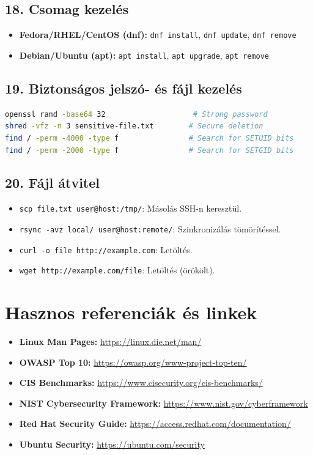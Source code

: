 \documentclass[12pt,a4paper]{article}
\begin{document}
\subsection{18. Csomag kezelés}

\begin{itemize}
  \item \textbf{Fedora/RHEL/CentOS (dnf):} \texttt{dnf install}, \texttt{dnf update}, \texttt{dnf remove}
  \item \textbf{Debian/Ubuntu (apt):} \texttt{apt install}, \texttt{apt upgrade}, \texttt{apt remove}
\end{itemize}

\subsection{19. Biztonságos jelszó- és fájl kezelés}

\begin{lstlisting}[language=bash,caption={Biztonságos műveletek}]
openssl rand -base64 32                    # Strong password
shred -vfz -n 3 sensitive-file.txt        # Secure deletion
find / -perm -4000 -type f                # Search for SETUID bits
find / -perm -2000 -type f                # Search for SETGID bits
\end{lstlisting}

\subsection{20. Fájl átvitel}

\begin{itemize}
  \item \texttt{scp file.txt user@host:/tmp/}: Másolás SSH-n keresztül.
  \item \texttt{rsync -avz local/ user@host:remote/}: Szinkronizálás tömörítéssel.
  \item \texttt{curl -o file http://example.com}: Letöltés.
  \item \texttt{wget http://example.com/file}: Letöltés (örökölt).
\end{itemize}

\section{Hasznos referenciák és linkek}

\begin{itemize}
  \item \textbf{Linux Man Pages:} \url{https://linux.die.net/man/}
  \item \textbf{OWASP Top 10:} \url{https://owasp.org/www-project-top-ten/}
  \item \textbf{CIS Benchmarks:} \url{https://www.cisecurity.org/cis-benchmarks/}
  \item \textbf{NIST Cybersecurity Framework:} \url{https://www.nist.gov/cyberframework}
  \item \textbf{Red Hat Security Guide:} \url{https://access.redhat.com/documentation/}
  \item \textbf{Ubuntu Security:} \url{https://ubuntu.com/security}
\end{itemize}
\end{document}
